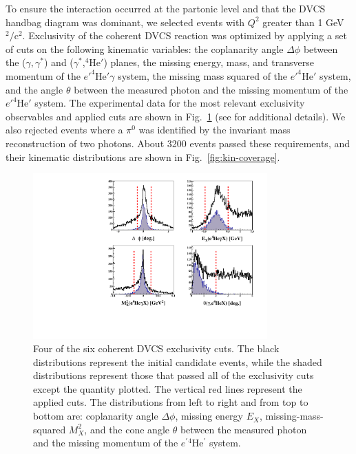\documentclass[twocolumn,nofootinbib,showpacs,prl,superscriptaddress,secnumarabic,amssymb,nobibnotes,aps,floatfix]{revtex4}
\begin{document}
To ensure the interaction occurred at the partonic level and that the DVCS handbag 
diagram was dominant, we selected events with $Q^{2}$ greater than 1 
GeV$^{2}/$c$^{2}$. Exclusivity of the coherent DVCS reaction was optimized by 
applying a set of cuts on the following kinematic variables: the coplanarity 
angle $\Delta\phi$ between the ($\gamma,\gamma^*$) 
and ($\gamma^*$,$^4$He$'$) planes, the missing energy, mass, and transverse
momentum of the $e'^4$He$'\gamma$ system, the missing mass squared of 
the $e'^4$He$'$ system, and the angle $\theta$
between the measured photon and the missing momentum of the $e'^4$He$'$ system.  
The experimental data for the most relevant exclusivity observables and applied
cuts are shown in Fig.~\ref{fig:kin-cuts} (see \cite{Hattawy:thesis} for 
additional details). We also 
rejected events where a $\pi^0$ was identified by the invariant mass reconstruction of 
two photons. About 3200 events passed these requirements, and their kinematic 
distributions are shown in Fig.~\ref{fig:kin-coverage}.

\begin{figure}[tb]
\includegraphics[width=9cm]{figs/F_all_coh_exc_cuts-pub.pdf}
\caption{Four of the six coherent DVCS exclusivity cuts. The black 
distributions represent the initial candidate events, while the shaded 
distributions represent those that passed all of the exclusivity cuts except 
the quantity plotted. The vertical red lines represent the applied cuts.
The distributions from left to right and from top to bottom are: coplanarity 
angle $\Delta \phi$, missing energy $E_X$, missing-mass-squared $M_X^2$, and 
the cone angle $\theta$ between the measured photon and the missing momentum 
of the $e^\prime{^4}$He$^\prime$ system.}
\label{fig:kin-cuts}
\end{figure}
 
\end{document}
